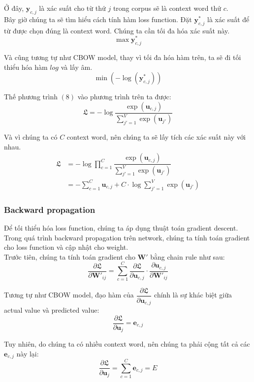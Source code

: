 \documentclass[12pt]{article}
\begin{document}
\indent Ở đây, $\boldsymbol{y}_{c,j}$ là xác suất cho từ thứ $j$ trong corpus sẽ là context word thứ $c$.\\

\indent Bây giờ chúng ta sẽ tìm hiểu cách tính hàm loss function. Đặt $\boldsymbol{y}^*_{c,j}$ là xác suất để từ được chọn đúng là context word. Chúng ta cần tối đa hóa xác suất này.
$$\max{\boldsymbol{y}^*_{c,j}}$$

\indent Và cũng tương tự như CBOW model, thay vì tối đa hóa hàm trên, ta sẽ đi tối thiểu hóa hàm $log$ và lấy âm.
$$\min{(-\log{(\boldsymbol{y}^*_{c,j})})}$$

\indent Thế phương trình $(8)$ vào phương trình trên ta được:
$$\mathfrak{L} = -\log{\dfrac{\exp{(\boldsymbol{u}_{c,j})}}{\sum_{j'=1}^V \exp{(\boldsymbol{u}_{j'})}}}$$

\indent Và vì chúng ta có $C$ context word, nên chúng ta sẽ lấy tích các xác suất này với nhau.
$$\begin{aligned} \mathfrak{L} &= -\log{\prod_{c=1}^{C} \dfrac{\exp{(\boldsymbol{u}_{c,j})}}{\sum_{j'=1}^V \exp{(\boldsymbol{u}_{j'})}}} \\ 
&= -\sum^{C}_{c=1} \boldsymbol{u}_{c,j} + C \cdot \log{\sum^V_{j'=1}} \exp{(\boldsymbol{u}_{j'})} \end{aligned}$$

\subsubsection{Backward propagation}
Để tối thiểu hóa loss function, chúng ta áp dụng thuật toán gradient descent. Trong quá trình backward propagation trên network, chúng ta tính toán gradient cho loss function và cập nhật cho weight.\\

\indent Trước tiên, chúng ta tính toán gradient cho $\boldsymbol{W'}$ bằng chain rule như sau:
$$\dfrac{\partial \mathfrak{L}}{\partial \boldsymbol{W'}_{ij}} = \sum^C_{c=1} \dfrac{\partial \mathfrak{L}}{\partial \boldsymbol{u}_{c,j}} \cdot \dfrac{\partial \boldsymbol{u}_{c,j}}{\partial \boldsymbol{W'}_{ij}}$$

\indent Tương tự như CBOW model, đạo hàm của $\dfrac{\partial \mathfrak{L}}{\partial \boldsymbol{u}_{c,j}}$ chính là sự khác biệt giữa actual value và predicted value:
$$\dfrac{\partial \mathfrak{L}}{\partial \boldsymbol{u}_{j}} = \boldsymbol{e}_{c,j}$$

\indent Tuy nhiên, do chúng ta có nhiều context word, nên chúng ta phải cộng tất cả các $\boldsymbol{e}_{c,j}$ này lại:
$$\dfrac{\partial \mathfrak{L}}{\partial \boldsymbol{u}_{j}} = \sum^C_{c=1} \boldsymbol{e}_{c,j} = E$$
\end{document}
